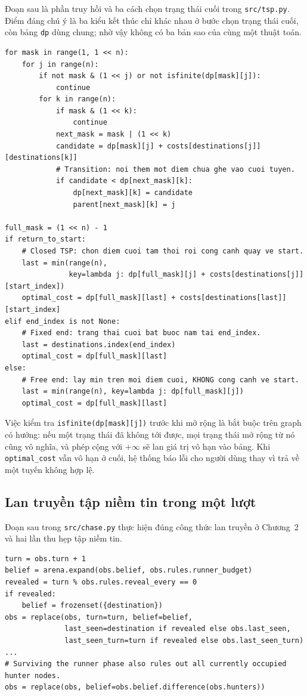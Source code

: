 Đoạn sau là phần truy hồi và ba cách chọn trạng thái cuối trong
\texttt{src/tsp.py}. Điểm đáng chú ý là ba kiểu kết thúc chỉ khác nhau ở bước
chọn trạng thái cuối, còn bảng \texttt{dp} dùng chung; nhờ vậy không có ba bản sao
của cùng một thuật toán.

\begin{lstlisting}[caption={Truy hồi Held--Karp và ba kiểu kết thúc},
                   label={lst:heldkarp}]
for mask in range(1, 1 << n):
    for j in range(n):
        if not mask & (1 << j) or not isfinite(dp[mask][j]):
            continue
        for k in range(n):
            if mask & (1 << k):
                continue
            next_mask = mask | (1 << k)
            candidate = dp[mask][j] + costs[destinations[j]][destinations[k]]
            # Transition: noi them mot diem chua ghe vao cuoi tuyen.
            if candidate < dp[next_mask][k]:
                dp[next_mask][k] = candidate
                parent[next_mask][k] = j

full_mask = (1 << n) - 1
if return_to_start:
    # Closed TSP: chon diem cuoi tam thoi roi cong canh quay ve start.
    last = min(range(n),
               key=lambda j: dp[full_mask][j] + costs[destinations[j]][start_index])
    optimal_cost = dp[full_mask][last] + costs[destinations[last]][start_index]
elif end_index is not None:
    # Fixed end: trang thai cuoi bat buoc nam tai end_index.
    last = destinations.index(end_index)
    optimal_cost = dp[full_mask][last]
else:
    # Free end: lay min tren moi diem cuoi, KHONG cong canh ve start.
    last = min(range(n), key=lambda j: dp[full_mask][j])
    optimal_cost = dp[full_mask][last]
\end{lstlisting}

Việc kiểm tra \texttt{isfinite(dp[mask][j])} trước khi mở rộng là bắt buộc trên
graph có hướng: nếu một trạng thái đã không tới được, mọi trạng thái mở rộng từ nó
cũng vô nghĩa, và phép cộng với $+\infty$ sẽ lan giá trị vô hạn vào bảng. Khi
\texttt{optimal\_cost} vẫn vô hạn ở cuối, hệ thống báo lỗi cho người dùng thay vì
trả về một tuyến không hợp lệ.

\subsection{Lan truyền tập niềm tin trong một lượt}

Đoạn sau trong \texttt{src/chase.py} thực hiện đúng công thức lan truyền ở
Chương~2 và hai lần thu hẹp tập niềm tin.

\begin{lstlisting}[caption={Cập nhật tập niềm tin theo lượt},label={lst:belief}]
turn = obs.turn + 1
belief = arena.expand(obs.belief, obs.rules.runner_budget)
revealed = turn % obs.rules.reveal_every == 0
if revealed:
    belief = frozenset({destination})
obs = replace(obs, turn=turn, belief=belief,
              last_seen=destination if revealed else obs.last_seen,
              last_seen_turn=turn if revealed else obs.last_seen_turn)
...
# Surviving the runner phase also rules out all currently occupied hunter nodes.
obs = replace(obs, belief=obs.belief.difference(obs.hunters))
\end{lstlisting}

